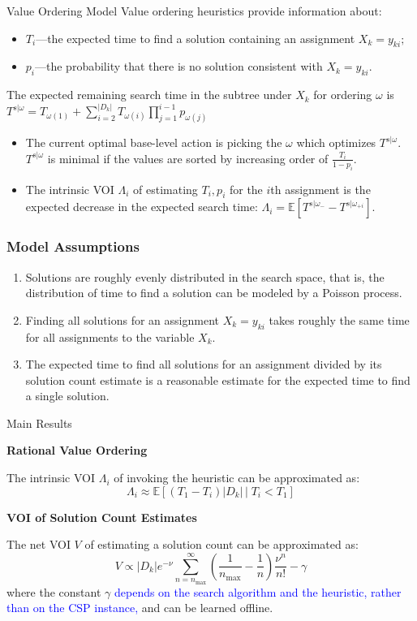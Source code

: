 \documentclass{beamer}
\begin{document}
\begin{frame}{Value Ordering Model}
Value ordering heuristics provide information about:
\begin{itemize}
 \item $T_i$---the expected time to find a solution containing
          an assignment  $X_k=y_{ki};$
\item $p_i$---the probability that there is no solution
  consistent with $X_k=y_{ki}$.
\end{itemize}
The expected remaining search time in the subtree under $X_k$ for
ordering $\omega$ is $T^{s|\omega}=T_{\omega(1)}+\sum_{i=2}^{|D_k|}T_{\omega(i)}\prod_{j=1}^{i-1}p_{\omega(j)}$
\begin{itemize}
\item The current optimal base-level action is picking the $\omega $ which optimizes $T^{s|\omega}$.  $T^{s|\omega}$ is minimal if the values are sorted  by increasing order of $\frac {T_i} {1-p_i}$.
\item The intrinsic VOI $\Lambda_i$ of estimating $T_i, p_i$ for the $i$th assignment is the expected decrease in the expected search time:
          $\Lambda_i=\mathbb{E}\left[T^{s|\omega_-}-T^{s|\omega_{+i}}\right]$.
\end{itemize}
\end{frame}

\begin{frame}
\frametitle{Model Assumptions}

\begin{enumerate}
\item Solutions are roughly evenly distributed in the search space, that is,
   the distribution of time to find a solution can be modeled by a
   Poisson process.
\item Finding all solutions for an assignment $X_{k}=y_{ki}$
takes roughly the same time for all assignments to the variable $X_k$.
\item The expected time to find all solutions for an assignment
  divided by its solution count estimate is a
  reasonable estimate for the expected time to find a single solution. 
\end{enumerate}
\end{frame}


\begin{frame}{Main Results}

{\large{\bf Rational Value Ordering}}

The intrinsic VOI $\Lambda_i$ of invoking the heuristic can be approximated as:
\[\Lambda_i\approx \mathbb{E}\left[(T_1-T_i)|D_k|\,\Big|\; T_i < T_1 \right]\]

{\large{\bf VOI of Solution Count Estimates}}

The net VOI $V$ of estimating a solution count can be approximated as:
\[V \propto |D_k|e^{-\nu}\sum_{n=n_\mathrm{max}}^\infty \! \! \left( \frac 1 {n_\mathrm{max}} - \frac 1 n\right) \frac {\nu^n} {n!}-\gamma\]
where the constant $\gamma$ \textcolor{blue}{depends on the search algorithm and the heuristic, rather than on the CSP instance,} and can be learned offline. 
\end{frame}
\end{document}
